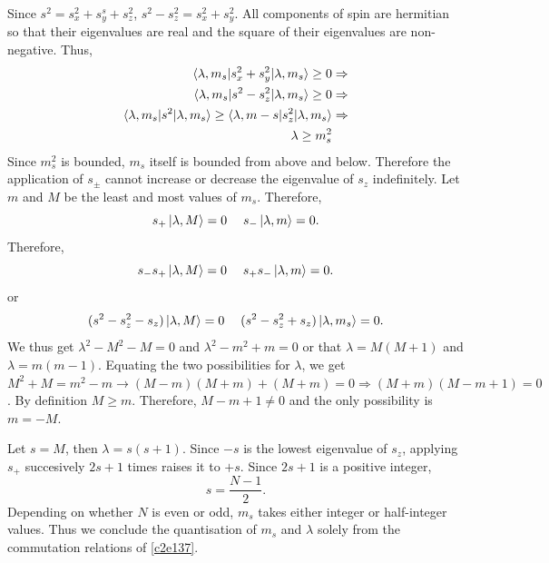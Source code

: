 Since $s^2 = s_x^2 + s_y^s + s_z^2$, $s^2 - s_z^2 = s_x^2 + s_y^2$. All
components of spin are hermitian so that their eigenvalues are real and the
square of their eigenvalues are non-negative. Thus, 
\begin{equation}\label{c2e144}
\begin{aligned}
\braket{\lambda, m_s|s_x^2 + s_y^2|\lambda, m_s} \ge 0 &\Rightarrow \\
\braket{\lambda, m_s|s^2 - s_z^2|\lambda, m_s} \ge 0 &\Rightarrow \\
\braket{\lambda, m_s|s^2|\lambda, m_s} \ge \braket{\lambda, m-s|s_z^2|\lambda, m_s}
&\Rightarrow \\
\lambda \ge m_s^2
\end{aligned}
\end{equation}
Since $m_s^2$ is bounded, $m_s$ itself is bounded from above and below. Therefore
the application of $s_\pm$ cannot increase or decrease the eigenvalue of $s_z$ 
indefinitely. Let $m$ and $M$ be the least and most values of $m_s$. Therefore,
\begin{equation}\label{c2e145}
s_+\ket{\lambda, M} = 0\;\quad s_-\ket{\lambda, m} = 0.
\end{equation}
Therefore,
\begin{equation}\label{c2e146}
s_-s_+\ket{\lambda, M} = 0\;\quad s_+s_-\ket{\lambda, m} = 0.
\end{equation}
or
\begin{equation}\label{c2e147}
(s^2 - s_z^2 - s_z)\ket{\lambda, M} = 0 \;\quad(s^2 - s_z^2 + s_z)\ket{\lambda,
m_s} = 0.
\end{equation}
We thus get $\lambda^2 - M^2 - M = 0$ and $\lambda^2 - m^2 + m = 0$ or that
$\lambda = M(M+1)$ and $\lambda = m(m-1)$. Equating the two possibilities for
$\lambda$, we get $M^2 + M = m^2 - m \rightarrow (M-m)(M+m) + (M+m) = 0 
\Rightarrow (M+m)(M-m+1) = 0$. By definition $M \ge m$. Therefore, $M - m + 1
\ne 0$ and the only possibility is $m = -M$.

Let $s = M$, then $\lambda = s(s + 1)$. Since $-s$ is the lowest eigenvalue of
$s_z$, applying $s_+$ succesively $2s + 1$ times raises it to $+s$. Since $2s+1$
is a positive integer,
\[
s = \frac{N - 1}{2}.
\]
Depending on whether $N$ is even or odd, $m_s$ takes either integer or 
half-integer values. Thus we conclude the quantisation of $m_s$ and $\lambda$ 
solely from the commutation relations of \eqref{c2e137}.

